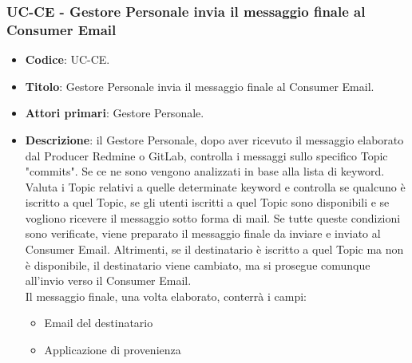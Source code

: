 \subsubsection{UC\theuccount-CE - Gestore Personale invia il messaggio finale al Consumer Email}
	\begin{itemize}
		\item \textbf{Codice}: UC\theuccount-CE.
		\item \textbf{Titolo}: Gestore Personale invia il messaggio finale al Consumer Email.
		\item \textbf{Attori primari}: Gestore Personale.
		\item \textbf{Descrizione}: il Gestore Personale, dopo aver ricevuto il messaggio elaborato dal
		Producer Redmine o GitLab, controlla i messaggi sullo specifico Topic "commits".
		Se ce ne sono
		vengono analizzati in base alla	lista di keyword.
		Valuta i Topic relativi a quelle determinate keyword e controlla se qualcuno è iscritto a quel Topic, se gli utenti iscritti a quel Topic sono disponibili e
		se vogliono ricevere il messaggio sotto forma di mail.
		Se tutte queste condizioni sono verificate, viene preparato il messaggio finale da inviare e inviato al Consumer Email. 
		Altrimenti, se il destinatario è iscritto a quel Topic ma non è disponibile, il destinatario viene cambiato, ma si prosegue comunque all'invio verso il Consumer Email.\\
		Il messaggio finale, una volta elaborato, conterrà i campi:
		\begin{itemize}
			\item Email del destinatario
			\item Applicazione di provenienza

\end{itemize}
\end{itemize}

